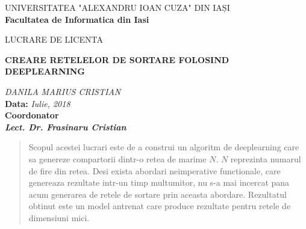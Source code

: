 \documentclass[12pt]{article}
\newcommand\blankpage{%
    \null
    \thispagestyle{empty}%
    \addtocounter{page}{-1}%
    \newpage}
\begin{document}
\afterpage{\blankpage}

\begin{titlepage}

\begin{center}

UNIVERSITATEA "ALEXANDRU IOAN CUZA" DIN IAȘI
\\
\textbf{Facultatea de Informatica din Iasi}
\end{center}

   \vspace{20mm}

\begin{center}
    \end{center}
   \vspace{10mm}
\begin{center}
	\Large{LUCRARE DE LICENTA}\\
	
	\vspace{10mm}
	
	\large \textbf{CREARE RETELELOR DE SORTARE FOLOSIND DEEPLEARNING}\\
	\vspace{5mm}
		
	\vspace{5mm}
	\large\textit {DANILA MARIUS CRISTIAN}
	\\
	\vspace{20mm}
	\textbf{Data: }\textit{Iulie, 2018}\\
	\vspace{10mm}
	\textbf{Coordonator}\\
	\textbf{\textit{Lect. Dr. Frasinaru Cristian}}
	\vspace{30mm}
\end{center}
\end{titlepage} 

\renewcommand{\refname}{Bibliografie}  %
\renewcommand{\contentsname}{Cuprins}



\begin{abstract}

Scopul acestei lucrari este de a construi un algoritm de deeplearning care sa genereze compartorii dintr-o retea de marime $N$. $N$ reprezinta numarul de fire din retea.
Desi exista abordari neimperative functionale, care genereaza rezultate intr-un timp multumitor, nu s-a mai incercat pana acum generarea de retele de sortare prin aceasta abordare. Rezultatul obtinut este un model antrenat care produce rezultate pentru retele de dimensiuni mici.

\tableofcontents

\end{abstract}
\end{document}
